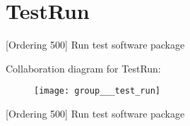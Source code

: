 \hypertarget{group___test_run}{\section{Test\-Run}
\label{group___test_run}
}


\mbox{[}Ordering 500\mbox{]} Run test software package  


Collaboration diagram for Test\-Run\-:
\nopagebreak
\begin{figure}[H]
\begin{center}
\leavevmode
\texttt{[image: group\_\_\_test\_run]}
\end{center}
\end{figure}
\mbox{[}Ordering 500\mbox{]} Run test software package 